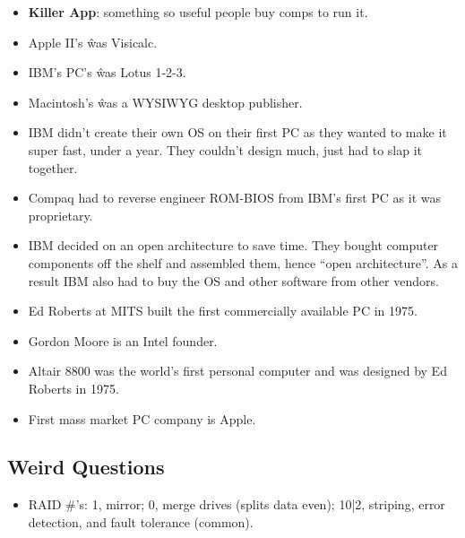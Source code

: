 \documentclass[fontsize=4.5pt]{scrartcl}
\begin{document}
\begin{multicols}{3}
\begin{itemize}
        \item \textbf{Killer App}: something so useful people buy comps to run it.
        \item Apple II's \^ was Visicalc.
        \item IBM's PC's \^ was Lotus 1-2-3.
        \item Macintosh's \^ was a WYSIWYG desktop publisher.
        \item IBM didn't create their own OS on their first PC as they wanted to make it super fast, under a year. They couldn't design much, just had to slap it together.
        \item Compaq had to reverse engineer ROM-BIOS from IBM's first PC as it was proprietary.
        \item IBM decided on an open architecture to save time. They bought computer components off the shelf and assembled them, hence ``open architecture''. As a result IBM
              also had to buy the OS and other software from other vendors.
        \item Ed Roberts at MITS built the first commercially available PC in 1975.
        \item Gordon Moore is an Intel founder.
        \item Altair 8800 was the world's first personal computer and was designed by Ed Roberts in 1975.
        \item First mass market PC company is Apple.
      \end{itemize}
     
     
     \subsection{Weird Questions}
       \begin{itemize}
         \item RAID \#'s: 1, mirror; 0, merge drives (splits data even); 10|2, striping, error detection, and fault tolerance (common).
       \end{itemize}




  \end{multicols}
\end{document}
